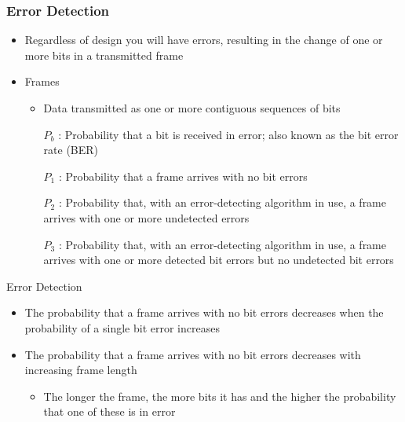 \documentclass[pdflatex,compress]{beamer}
\begin{document}
\begin{frame}
	\frametitle{Error Detection}
	\begin{itemize}
		\item Regardless of design you will have errors, resulting in the change of one or more bits in a transmitted frame
		\item Frames
		\begin{itemize}
			\item Data transmitted as one or more contiguous sequences of bits
			\item[$ P_b $ :] Probability that a bit is received in error; also known as the bit error rate (BER)
			\item[$ P_1 $ :] Probability that a frame arrives with no bit errors
			\item[$ P_2 $ :] Probability that, with an error-detecting algorithm in use, a frame arrives with one or more undetected errors
			\item[$ P_3 $ :] Probability that, with an error-detecting algorithm in use, a frame arrives with one or more detected bit errors but no undetected bit errors
		\end{itemize}
	\end{itemize}
\end{frame}

\begin{frame}{Error Detection}
	\begin{itemize}
		\item The probability that a frame arrives with no bit errors decreases when the probability of a single bit error increases
		\item The probability that a frame arrives with no bit errors decreases with increasing frame length
		\begin{itemize}
			\item The longer the frame, the more bits it has and the higher the probability that one of these is in error
		\end{itemize}
	\end{itemize}
\end{frame}
\end{document}
